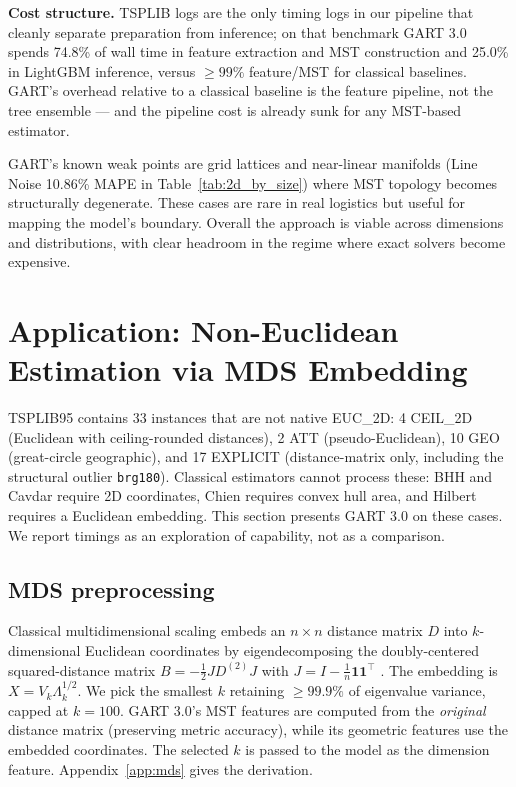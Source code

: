 \textbf{Cost structure.} TSPLIB logs are the only timing logs in our pipeline that cleanly separate preparation from inference; on that benchmark GART 3.0 spends 74.8\% of wall time in feature extraction and MST construction and 25.0\% in LightGBM inference, versus $\ge 99\%$ feature/MST for classical baselines. GART's overhead relative to a classical baseline is the feature pipeline, not the tree ensemble --- and the pipeline cost is already sunk for any MST-based estimator.

GART's known weak points are grid lattices and near-linear manifolds (Line Noise 10.86\% MAPE in Table~\ref{tab:2d_by_size}) where MST topology becomes structurally degenerate. These cases are rare in real logistics but useful for mapping the model's boundary. Overall the approach is viable across dimensions and distributions, with clear headroom in the regime where exact solvers become expensive.

\section{Application: Non-Euclidean Estimation via MDS Embedding} \label{sec:application}

TSPLIB95 contains 33 instances that are not native EUC\_2D: 4 CEIL\_2D (Euclidean with ceiling-rounded distances), 2 ATT (pseudo-Euclidean), 10 GEO (great-circle geographic), and 17 EXPLICIT (distance-matrix only, including the structural outlier \texttt{brg180}). Classical estimators cannot process these: BHH and Cavdar require 2D coordinates, Chien requires convex hull area, and Hilbert requires a Euclidean embedding. This section presents GART 3.0 on these cases. We report timings as an exploration of capability, not as a comparison.

\subsection{MDS preprocessing}

Classical multidimensional scaling embeds an $n \times n$ distance matrix $D$ into $k$-dimensional Euclidean coordinates by eigendecomposing the doubly-centered squared-distance matrix $B = -\tfrac{1}{2} J D^{(2)} J$ with $J = I - \tfrac{1}{n}\mathbf{1}\mathbf{1}^\top$ \citep{borg2005mds}. The embedding is $X = V_k \Lambda_k^{1/2}$. We pick the smallest $k$ retaining $\ge 99.9\%$ of eigenvalue variance, capped at $k = 100$. GART 3.0's MST features are computed from the \emph{original} distance matrix (preserving metric accuracy), while its geometric features use the embedded coordinates. The selected $k$ is passed to the model as the dimension feature. Appendix~\ref{app:mds} gives the derivation.

